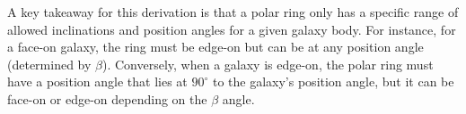 \documentclass[fleqn,usenatbib]{mnras}
\begin{document}
A key takeaway for this derivation is that a polar ring only has a specific range of allowed inclinations and position angles for a given galaxy body.  For instance, for a face-on galaxy, the ring must be edge-on but can be at any position angle (determined by $\beta$).  Conversely, when a galaxy is edge-on, the polar ring must have a position angle that lies at $90^{\circ}$ to the galaxy's position angle, but it can be face-on or edge-on depending on the $\beta$ angle.




\bsp	%
\label{lastpage}
\end{document}
